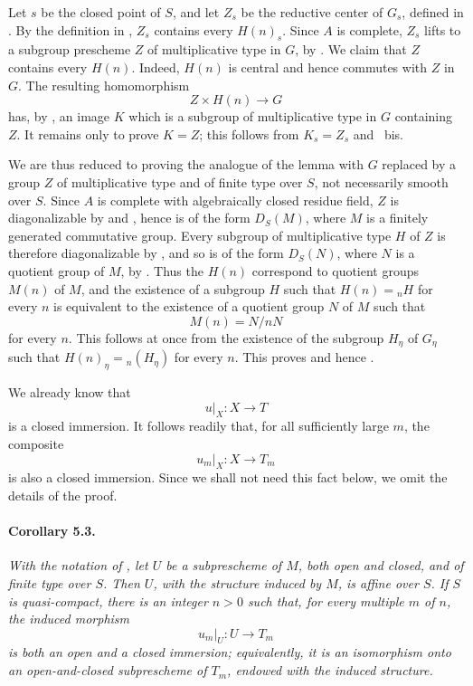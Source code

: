 Let \(s\) be the closed point of \(S\), and let \(Z_s\) be the
reductive center of \(G_s\), defined in . By the definition in
, \(Z_s\) contains every \(H(n)_s\). Since \(A\) is complete,
\(Z_s\) lifts to a subgroup prescheme \(Z\) of multiplicative type
in \(G\), by . We claim that \(Z\) contains every \(H(n)\).
Indeed, \(H(n)\) is central and hence commutes with \(Z\) in \(G\).
The resulting homomorphism
\[
  Z\times H(n)\longrightarrow G
\]
has, by , an image \(K\) which is a subgroup of multiplicative
type in \(G\) containing \(Z\). It remains only to prove \(K=Z\);
this follows from \(K_s=Z_s\) and ~bis.

We are thus reduced to proving the analogue of the lemma with \(G\)
replaced by a group \(Z\) of multiplicative type and of finite type
over \(S\), not necessarily smooth over \(S\). Since \(A\) is
complete with algebraically closed residue field, \(Z\) is
diagonalizable by  and , hence is of the form
\(D_S(M)\), where \(M\) is a finitely generated commutative group.
Every subgroup of multiplicative type \(H\) of \(Z\) is therefore
diagonalizable by , and so is of the form \(D_S(N)\),
where \(N\) is a quotient group of \(M\), by . Thus the
\(H(n)\) correspond to quotient groups \(M(n)\) of \(M\), and the
existence of a subgroup \(H\) such that \(H(n)={}_nH\) for every
\(n\) is equivalent to the existence of a quotient group \(N\) of
\(M\) such that
\[
  M(n)=N/nN
\]
for every \(n\). This follows at once from the existence of the
subgroup \(H_\eta\) of \(G_\eta\) such that
\(H(n)_\eta={}_n(H_\eta)\) for every \(n\). This proves 
and hence .

\textup{} We already know that
\[
  u|_X:X\longrightarrow T
\]
is a closed immersion. It follows readily that, for all sufficiently
large \(m\), the composite
\[
  u_m|_X:X\longrightarrow T_m
\]
is also a closed immersion. Since we shall not need this fact below,
we omit the details of the proof.

\paragraph{\textbf{Corollary 5.3.}}
\emph{With the notation of , let \(U\) be a subprescheme of
\(M\), both open and closed, and of finite type over \(S\). Then
\(U\), with the structure induced by \(M\), is affine over \(S\).
If \(S\) is quasi-compact, there is an integer \(n>0\) such that,
for every multiple \(m\) of \(n\), the induced morphism
\[
  u_m|_U:U\longrightarrow T_m
\]
is both an open and a closed immersion; equivalently, it is an
isomorphism onto an open-and-closed subprescheme of \(T_m\), endowed
with the induced structure.}

